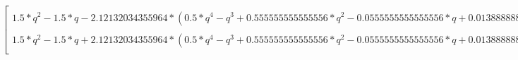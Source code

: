 \[
\begin{bmatrix}
1.5*q^2 - 1.5*q - 2.12132034355964*(0.5*q^4 - q^3 + 0.555555555555556*q^2 - 0.0555555555555556*q + 0.0138888888888889)^0.5 + 0.75\\
1.5*q^2 - 1.5*q + 2.12132034355964*(0.5*q^4 - q^3 + 0.555555555555556*q^2 - 0.0555555555555556*q + 0.0138888888888889)^0.5 + 0.75\\
\end{bmatrix}
\]
